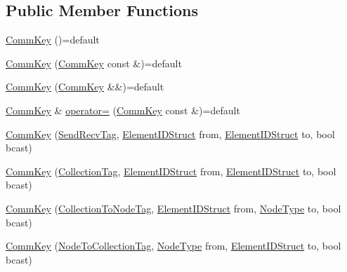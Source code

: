 \subsection*{Public Member Functions}
\begin{DoxyCompactItemize}
\item 
\hyperlink{structvt_1_1elm_1_1_comm_key_ab6e9e495a97be72463739214749e07fb}{Comm\+Key} ()=default
\item 
\hyperlink{structvt_1_1elm_1_1_comm_key_a9132a232fca96f1996c275e1fc2d5910}{Comm\+Key} (\hyperlink{structvt_1_1elm_1_1_comm_key}{Comm\+Key} const \&)=default
\item 
\hyperlink{structvt_1_1elm_1_1_comm_key_af7736d2d35d45730b15c8ab68100c93e}{Comm\+Key} (\hyperlink{structvt_1_1elm_1_1_comm_key}{Comm\+Key} \&\&)=default
\item 
\hyperlink{structvt_1_1elm_1_1_comm_key}{Comm\+Key} \& \hyperlink{structvt_1_1elm_1_1_comm_key_adff52fedcd092e88bff3d46a5c23bd92}{operator=} (\hyperlink{structvt_1_1elm_1_1_comm_key}{Comm\+Key} const \&)=default
\item 
\hyperlink{structvt_1_1elm_1_1_comm_key_a0effc1fd3e2eebbcd7aa4b3a0b5b5949}{Comm\+Key} (\hyperlink{structvt_1_1elm_1_1_comm_key_1_1_send_recv_tag}{Send\+Recv\+Tag}, \hyperlink{structvt_1_1elm_1_1_element_i_d_struct}{Element\+I\+D\+Struct} from, \hyperlink{structvt_1_1elm_1_1_element_i_d_struct}{Element\+I\+D\+Struct} to, bool bcast)
\item 
\hyperlink{structvt_1_1elm_1_1_comm_key_a2e0ddb556b68ee07656a0885524dfad3}{Comm\+Key} (\hyperlink{structvt_1_1elm_1_1_comm_key_1_1_collection_tag}{Collection\+Tag}, \hyperlink{structvt_1_1elm_1_1_element_i_d_struct}{Element\+I\+D\+Struct} from, \hyperlink{structvt_1_1elm_1_1_element_i_d_struct}{Element\+I\+D\+Struct} to, bool bcast)
\item 
\hyperlink{structvt_1_1elm_1_1_comm_key_ac8cb57b096ed4d9102166683a2aecb91}{Comm\+Key} (\hyperlink{structvt_1_1elm_1_1_comm_key_1_1_collection_to_node_tag}{Collection\+To\+Node\+Tag}, \hyperlink{structvt_1_1elm_1_1_element_i_d_struct}{Element\+I\+D\+Struct} from, \hyperlink{namespacevt_a866da9d0efc19c0a1ce79e9e492f47e2}{Node\+Type} to, bool bcast)
\item 
\hyperlink{structvt_1_1elm_1_1_comm_key_ac7803fe0fe9642f2f34eb474b61c17da}{Comm\+Key} (\hyperlink{structvt_1_1elm_1_1_comm_key_1_1_node_to_collection_tag}{Node\+To\+Collection\+Tag}, \hyperlink{namespacevt_a866da9d0efc19c0a1ce79e9e492f47e2}{Node\+Type} from, \hyperlink{structvt_1_1elm_1_1_element_i_d_struct}{Element\+I\+D\+Struct} to, bool bcast)

\end{DoxyCompactItemize}
